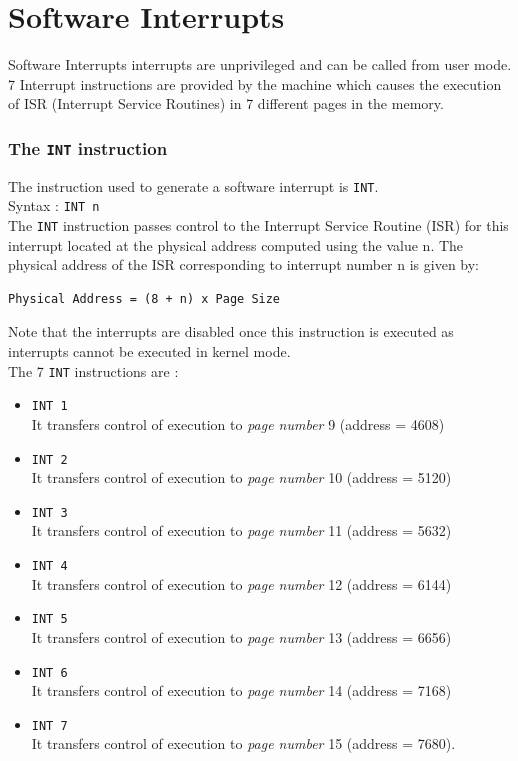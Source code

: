 \documentclass[11pt]{report}
\begin{document}
\section{Software Interrupts }
Software Interrupts interrupts are unprivileged and can be called from user mode. 7 Interrupt instructions are provided by the machine which causes the execution of ISR (Interrupt Service Routines) in 7 different pages in the memory. 

\subsubsection{The \texttt{INT} instruction}
The instruction used to generate a software interrupt is \texttt{INT}.\\
Syntax : \texttt{INT n}\\
The \texttt{INT} instruction passes control to the Interrupt Service Routine (ISR) for this interrupt located at the physical address computed using the value n. The physical address of the ISR corresponding to interrupt number n is given by: 
\begin{verbatim}
Physical Address = (8 + n) x Page Size
\end{verbatim}
Note that the interrupts are disabled once this instruction is executed as interrupts cannot be executed in kernel mode.\\

The 7 \texttt{INT} instructions are :
\begin{itemize}

\item \texttt{INT 1}  \\It transfers control of execution to \textit{page number} 9 (address = 4608)
\item \texttt{INT 2}  \\It transfers control of execution to \textit{page number} 10 (address = 5120)  
\item \texttt{INT 3}  \\It transfers control of execution to \textit{page number} 11 (address = 5632)
\item \texttt{INT 4}  \\It transfers control of execution to \textit{page number}  12 (address = 6144) 
\item \texttt{INT 5}  \\It transfers control of execution to \textit{page number} 13 (address = 6656)
\item \texttt{INT 6}  \\It transfers control of execution to \textit{page number} 14 (address = 7168)
\item \texttt{INT 7}  \\It transfers control of execution to \textit{page number} 15 (address = 7680).\
 
\end{itemize}
\end{document}
